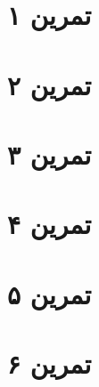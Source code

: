\documentclass[11pt]{article}
\begin{document}
\section*{تمرین ۱}

\pagebreak
\section*{تمرین ۲}

\section*{تمرین ۳}

\pagebreak
\section*{تمرین ۴}

\pagebreak
\section*{تمرین ۵}

\section*{تمرین ۶}

\end{document}
